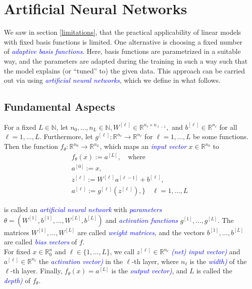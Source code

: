 \chapter{Artificial Neural Networks}\label{chp:3}

We saw in section \ref{limitations}, that the practical applicability of linear models with fixed basis functions is limited. One alternative is choosing a fixed number of \textcolor{blue}{\emph{adaptive basis functions}}. Here, basis functions are parametrized in a suitable way, and the parameters are adapted during the training in such a way such that the model explains (or “tuned” to) the given data. This approach can be carried out via using \textcolor{blue}{\emph{artificial neural networks}}, which we define in what follows.

\section{Fundamental Aspects}

\begin{definition}
For a fixed $L \in \mathbb{N}$, let $n_0, \dots, n_L \in \mathbb{N}, W^{[\ell]} \in \mathbb{R}^{n_{\ell} \times n_{\ell -1}},$ and $b^{[\ell]} \in \mathbb{R}^{n_{\ell}}$ for all $\ell = 1, \dots, L$. Furthermore, let $g^{[\ell]}: \mathbb{R}^{n_{\ell}} \rightarrow \mathbb{R}^{n_{\ell}}$ for $\ell = 1, \dots, L$ be some functions. Then the function $f_{\theta} : \mathbb{R}^{n_0} \rightarrow \mathbb{R}^{n_L}$, which maps an \textcolor{blue}{\emph{input vector}} $x \in \mathbb{R}^{n_0}$ to
\begin{align}
    &f_{\theta}(x) := a^{[L]}, \quad \text{where}\\
    &a^{[0]} := x,\\
    &z^{[\ell]} := W^{[\ell]} a^{[\ell-1]} + b^{[\ell]},\\
    &a^{[\ell]} := g^{[\ell]}(z^{[\ell]}), \Biggr\} \quad \ell = 1, \ldots, L
    \label{eqn:29}
\end{align}

is called an \textcolor{blue}{\emph{artificial neural network}} with \textcolor{blue}{\emph{parameters}} $\theta = (W^{[1]}, b^{[1]}, \ldots, W^{[L]}, b^{[L]})$ and \textcolor{blue}{\emph{activation functions}} $g^{[1]}, \ldots, g^{[L]}$. The matrices $W^{[1]}, \ldots, W^{[L]}$ are called \textcolor{blue}{\emph{weight matrices}}, and the vectors $b^{[1]}, \ldots, b^{[L]}$ are called \textcolor{blue}{\emph{bias vectors}} of $f$.\\

For fixed $x \in \mathbb{R}^n_0$ and $\ell \in \{1, \ldots, L\}$, we call $z^{[\ell]} \in \mathbb{R}^{n_{\ell}}$ \textcolor{blue}{\emph{(net) input vector)}} and $a^{[\ell]} \in \mathbb{R}^{n_{\ell}}$ the \textcolor{blue}{\emph{activation vector)}} in the $\ell$-th layer, where $n_{\ell}$ is the \textcolor{blue}{\emph{width)}} of the $\ell$-th layer. Finally, $f_{\theta}(x)=a^{[L]}$ is the \textcolor{blue}{\emph{output vector)}}, and $L$ is called the \textcolor{blue}{\emph{depth)}} of $f_{\theta}$.
\end{definition}

